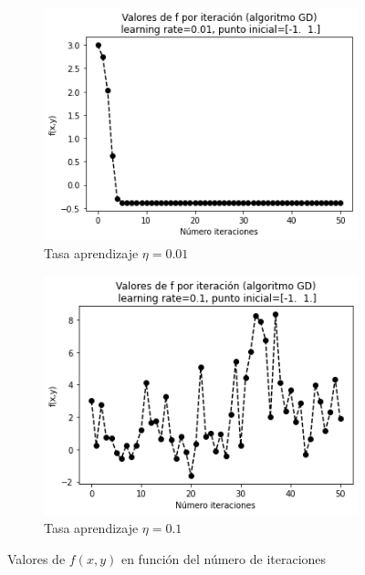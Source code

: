 \documentclass[11pt,a4paper]{article}
\theoremstyle{definition}
\begin{document}
\begin{itemize}
	\begin{figure}[H]
		\centering
		\begin{subfigure}{.5\textwidth}
  		\centering
  		\includegraphics[width=1\textwidth]{images/f_por_iter_lr_01}
  		\caption{Tasa aprendizaje $\eta = 0.01$}
  		\label{fig:sub1}
		\end{subfigure}%
		\begin{subfigure}{.5\textwidth}
  		\centering
  		\includegraphics[width=1\textwidth]{images/f_por_iter_lr_1}
  		\caption{Tasa aprendizaje $\eta = 0.1$}
  		\label{fig:sub2}
		\end{subfigure}
		\caption{Valores de $f(x,y)$ en función del número de iteraciones}
		\label{fig:test}
	\end{figure}



\end{itemize}
\end{document}
